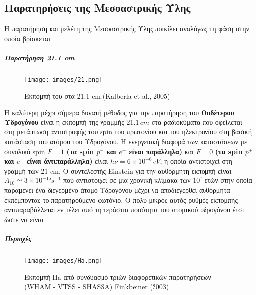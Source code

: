 \documentclass[a4paper,12pt]{memoir}
\begin{document}
\subsection{Παρατηρήσεις της Μεσοαστρικής Ύλης}
Η παρατήρηση και μελέτη της Μεσοαστρικής Ύλης ποικίλει αναλόγως τη φάση στην οποία βρίσκεται.
\subparagraph{Παρατήρηση 21.1 cm}
\begin{figure}[h!]
	\centering
	\texttt{[image: images/21.png]}
	\caption{Εκπομπή του  στα 21.1 cm (Kalberla et al., 2005)}
\end{figure}

H καλύτερη μέχρι σήμερα δυνατή μέθοδος για την παρατήρηση του \textbf{Ουδέτερου Υδρογόνου } είναι η εκπομπή της γραμμής $21.1 \, cm$ στα ραδιοκύματα που οφείλεται στη μετάπτωση αντιστροφής του spin του πρωτονίου και του ηλεκτρονίου στη βασική κατάσταση του ατόμου του Υδρογόνου. Η ενεργειακή διαφορά των καταστάσεων με συνολικό spin $F=1$ \textbf{(τα spin $p^+$ και $e^-$ είναι παράλληλα)} και $F=0$ \textbf{(τα spin $p^+$ και $e^-$ είναι άντιπαράλληλα)} είναι $h \nu=6\times 10^{-6} \, eV$, η οποία αντιστοιχεί στη γραμμή των 21 cm.
Ο συντελεστής Einstein για την αυθόρμητη εκπομπή είναι $A_{10} \simeq 3\times 10^{-15}s^{-1}$ που αντιστοιχεί σε μια χρονική κλίμακα των $10^7$ ετών στην οποία παραμένει ένα διεγερμένο άτομο Υδρογόνου μέχρι να αποδιεγερθεί αυθόρμητα εκπέμποντας το παρατηρούμενο φωτόνιο. Ο πολύ μικρός αυτός ρυθμός εκπομπής αντιπαραβάλλεται  εν τέλει από τη τεράστια ποσότητα του ατομικού υδρογόνου έτσι ώστε να είναι     

\subparagraph{Περιοχές }
\begin{figure}[h!]
	\centering
	\texttt{[image: images/Ha.png]}
	\caption{Εκπομπή Ha από συνδυασμό τριών διαφορετικών παρατηρήσεων (WHAM - VTSS - SHASSA) Finkbeiner (2003)}
\end{figure}
\end{document}
